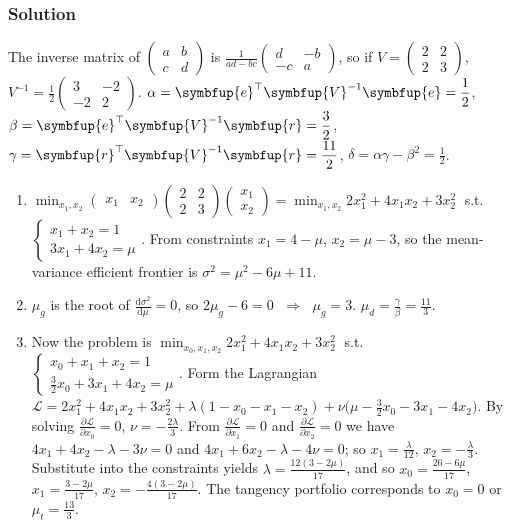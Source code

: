 \documentclass[10pt]{beamer}
\newcommand{\ds}{\displaystyle}
\newcommand{\ie}{\;\Longrightarrow\;}
\newcommand{\vV}{\symbfup{V}}
\newcommand{\ve}{\symbfup{e}}
\newcommand{\vr}{\symbfup{r}}
\theoremstyle{definition}
\begin{document}
\begin{frame}[allowframebreaks]
  \frametitle{Solution}
  The inverse matrix of $\ds\begin{pmatrix}a & b \\ c & d\end{pmatrix}$ is $\ds\frac{1}{ad - bc}\begin{pmatrix}d & -b \\ -c & a\end{pmatrix}$, so if $\ds V = \begin{pmatrix}2 & 2 \\ 2 & 3\end{pmatrix}$, $\ds V^{-1} = \frac{1}{2}\begin{pmatrix}3 & -2 \\ -2 & 2\end{pmatrix}$. $\ds\alpha = \ve^\top\vV^{-1}\ve = \frac{1}{2}$, $\ds\beta = \ve^\top\vV^{-1}\vr = \frac{3}{2}$, $\ds\gamma = \vr^\top\vV^{-1}\vr = \frac{11}{2}$, $\ds\delta = \alpha\gamma - \beta^2 = \frac{1}{2}$.
  \begin{enumerate}
    \item $\ds\min_{x_1, x_2}\begin{pmatrix}x_1 & x_2\end{pmatrix}\begin{pmatrix}2 & 2\\ 2 & 3\end{pmatrix}\begin{pmatrix}x_1 \\ x_2\end{pmatrix} = \min_{x_1, x_2} 2x_1^2 + 4x_1 x_2 + 3x_2^2\;$ s.t. $\ds\begin{cases}x_1 + x_2 = 1 \\ 3x_1 + 4 x_2 = \mu\end{cases}$. From constraints $x_1 = 4 - \mu$, $x_2 = \mu - 3$, so the mean-variance efficient frontier is $\sigma^2 = \mu^2 - 6\mu + 11$.  
    \item $\mu_g$ is the root of $\ds\frac{\text{d}\sigma^2}{\text{d}\mu} = 0$, so $2\mu_g - 6 = 0$ $\ie$ $\mu_g = 3$. $\ds\mu_d = \frac{\gamma}{\beta} = \frac{11}{3}$.
    \item Now the problem is $\ds\min_{x_0, x_1, x_2} 2x_1^2 + 4x_1 x_2 + 3x_2^2\;$ s.t. $\ds\begin{cases}x_0 + x_1 + x_2 = 1 \\ \frac{3}{2}x_0 + 3x_1 + 4 x_2 = \mu\end{cases}$. Form the Lagrangian $\ds\mathcal{L} = 2x_1^2 + 4x_1 x_2 + 3x_2^2 + \lambda(1 - x_0 - x_1 - x_2) + \nu\big(\mu - \frac{3}{2}x_0 - 3x_1 - 4 x_2\big)$. By solving $\ds\frac{\partial\mathcal{L}}{\partial x_0} = 0$, $\ds\nu = -\frac{2\lambda}{3}$. From $\ds\frac{\partial\mathcal{L}}{\partial x_1} = 0$ and $\ds\frac{\partial\mathcal{L}}{\partial x_2} = 0$ we have $4x_1 + 4x_2 - \lambda - 3\nu = 0$ and $4x_1 + 6 x_2 - \lambda - 4\nu = 0$; so $\ds x_1 = \frac{\lambda}{12}$, $\ds x_2 = -\frac{\lambda}{3}$. Substitute into the constraints yields $\ds\lambda = \frac{12(3 - 2\mu)}{17}$, and so $\ds x_0 = \frac{26 - 6\mu}{17}$, $\ds x_1 = \frac{3 - 2\mu}{17}$, $\ds x_2 = -\frac{4(3 - 2\mu)}{17}$. The tangency portfolio corresponds to $x_0 = 0$ or $\ds\mu_t = \frac{13}{3}$.

\end{enumerate}
\end{frame}
\end{document}
